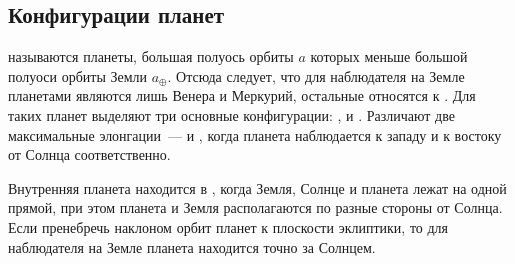 \subsection{Конфигурации планет}
 называются планеты, большая полуось орбиты 
$a$ которых меньше большой полуоси орбиты Земли $a_\oplus$. Отсюда следует, что для наблюдателя на Земле  планетами являются лишь Венера и Меркурий, остальные относятся к . Для таких планет выделяют три основные конфигурации: ,  и . Различают две максимальные элонгации~---  и , когда планета наблюдается к западу и к востоку от Солнца соответственно.

Внутренняя планета находится в , когда Земля, Солнце и планета лежат на одной прямой, при этом планета и Земля располагаются по разные стороны от Солнца. Если пренебречь наклоном орбит планет к плоскости эклиптики, то для наблюдателя на Земле планета находится точно за Солнцем.

